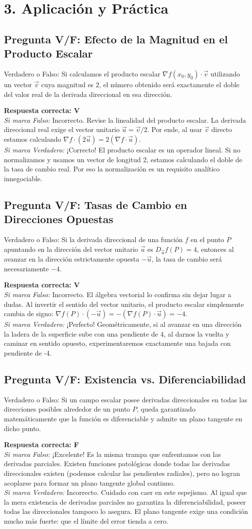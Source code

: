 \documentclass[11pt]{article}
\newenvironment{aplicacion}{%
  \section*{3. Aplicación y Práctica}%
}{}
\newenvironment{preguntaverdaderofalso}[1]{\subsection*{Pregunta V/F: #1}\par\vspace{0.1cm}}{\vspace{0.3cm}}
\newcommand{\verdaderofalso}[3]{\par\noindent\textbf{Respuesta correcta: #1} \\ \textit{Si marca Falso:} #2 \\ \textit{Si marca Verdadero:} #3\par\vspace{0.15cm}}
\begin{document}
\begin{aplicacion}
  \begin{preguntaverdaderofalso}{Efecto de la Magnitud en el Producto Escalar}
    Verdadero o Falso: Si calculamos el producto escalar $\nabla f(x_0, y_0) \cdot \vec{v}$ utilizando un vector $\vec{v}$ cuya magnitud es $2$, el número obtenido será exactamente el doble del valor real de la derivada direccional en esa dirección.
    
    \verdaderofalso{V}
      {Incorrecto. Revise la linealidad del producto escalar. La derivada direccional real exige el vector unitario $\vec{u} = \vec{v}/2$. Por ende, al usar $\vec{v}$ directo estamos calculando $\nabla f \cdot (2\vec{u}) = 2(\nabla f \cdot \vec{u})$.}
      {¡Correcto! El producto escalar es un operador lineal. Si no normalizamos y usamos un vector de longitud 2, estamos calculando el doble de la tasa de cambio real. Por eso la normalización es un requisito analítico innegociable.}
  \end{preguntaverdaderofalso}

  \begin{preguntaverdaderofalso}{Tasas de Cambio en Direcciones Opuestas}
    Verdadero o Falso: Si la derivada direccional de una función $f$ en el punto $P$ apuntando en la dirección del vector unitario $\vec{u}$ es $D_{\vec{u}}f(P) = 4$, entonces al avanzar en la dirección estrictamente opuesta $-\vec{u}$, la tasa de cambio será necesariamente $-4$.
    
    \verdaderofalso{V}
      {Incorrecto. El álgebra vectorial lo confirma sin dejar lugar a dudas. Al invertir el sentido del vector unitario, el producto escalar simplemente cambia de signo: $\nabla f(P) \cdot (-\vec{u}) = -(\nabla f(P) \cdot \vec{u}) = -4$.}
      {¡Perfecto! Geométricamente, si al avanzar en una dirección la ladera de la superficie sube con una pendiente de 4, al darnos la vuelta y caminar en sentido opuesto, experimentaremos exactamente una bajada con pendiente de -4.}
  \end{preguntaverdaderofalso}

  \begin{preguntaverdaderofalso}{Existencia vs. Diferenciabilidad}
    Verdadero o Falso: Si un campo escalar posee derivadas direccionales en todas las direcciones posibles alrededor de un punto $P$, queda garantizado matemáticamente que la función es diferenciable y admite un plano tangente en dicho punto.
    
    \verdaderofalso{F}
      {¡Excelente! Es la misma trampa que enfrentamos con las derivadas parciales. Existen funciones patológicas donde todas las derivadas direccionales existen (podemos calcular las pendientes radiales), pero no logran acoplarse para formar un plano tangente global continuo.}
      {Incorrecto. Cuidado con caer en este espejismo. Al igual que la mera existencia de derivadas parciales no garantiza la diferenciabilidad, poseer todas las direccionales tampoco lo asegura. El plano tangente exige una condición mucho más fuerte: que el límite del error tienda a cero.}
  \end{preguntaverdaderofalso}


\end{aplicacion}
\end{document}
